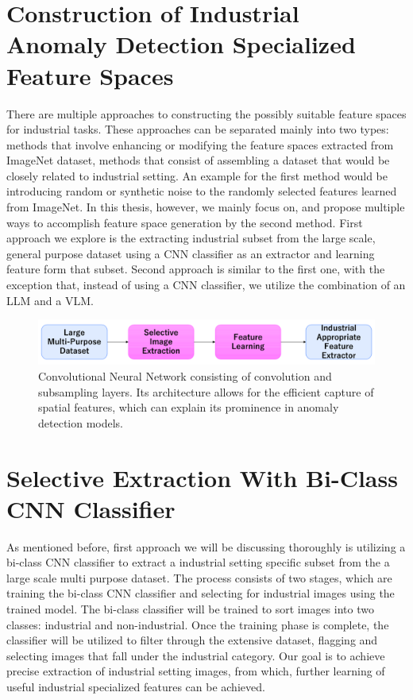 \section{Construction of Industrial Anomaly Detection Specialized Feature Spaces}
\label{construction}
There are multiple approaches to constructing the possibly suitable feature spaces for industrial tasks. These approaches can be separated mainly into two types: methods that involve enhancing or modifying the feature spaces extracted from ImageNet dataset, methods that consist of assembling a dataset that would be closely related to industrial setting. An example for the first method would be introducing random or synthetic noise to the randomly selected features learned from ImageNet. In this thesis, however, we mainly focus on, and propose multiple ways to accomplish feature space generation by the second method. First approach we explore is the extracting industrial subset from the large scale, general purpose dataset using a CNN classifier as an extractor and learning feature form that subset. Second approach is similar to the first one, with the exception that, instead of using a CNN classifier, we utilize the combination of an LLM and a VLM.

\begin{figure}[h]
	\begin{center}
		\includegraphics[width=1.0\linewidth]{Chapter_3/selective_extraction.png}
	\end{center}
	\caption{Convolutional Neural Network consisting of convolution and subsampling layers. Its architecture allows for the efficient capture of spatial features, which can explain its prominence in anomaly detection models.}
	\label{fig:cnn}
\end{figure} 	

\section{Selective Extraction With Bi-Class CNN Classifier}
\label{cnn extraction}
As mentioned before, first approach we will be discussing thoroughly is utilizing a bi-class CNN classifier to extract a industrial setting specific subset from the a large scale multi purpose dataset. The process consists of two stages, which are training the bi-class CNN classifier and selecting for industrial images using the trained model. The bi-class classifier will be trained to sort images into two classes: industrial and non-industrial. Once the training phase is complete, the classifier will be utilized to filter through the extensive dataset, flagging and selecting images that fall under the industrial category. Our goal is to achieve precise extraction of industrial setting images, from which, further learning of useful industrial specialized features can be achieved. 

